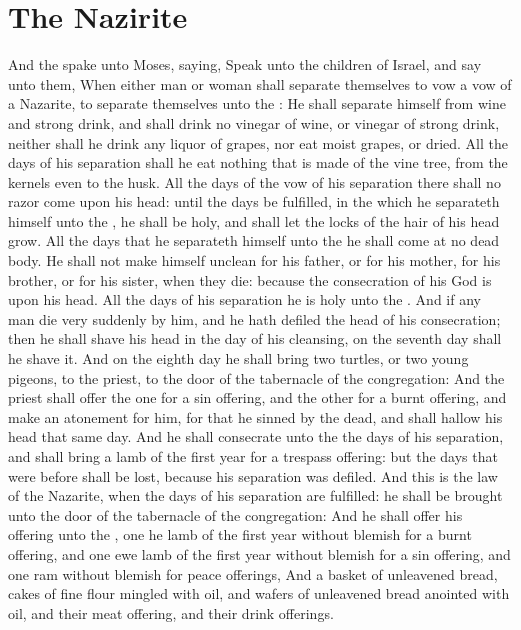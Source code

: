 \section*{The Nazirite}
\begin{biblechapter} %
\verse And the \LORD spake unto Moses, saying,
\verse Speak unto the children of Israel, and say unto them, When either man or woman shall separate themselves to vow a vow of a Nazarite, to separate themselves unto the \LORD:
\verse He shall separate himself from wine and strong drink, and shall drink no vinegar of wine, or vinegar of strong drink, neither shall he drink any liquor of grapes, nor eat moist grapes, or dried.
\verse All the days of his separation shall he eat nothing that is made of the vine tree, from the kernels even to the husk.
\verse All the days of the vow of his separation there shall no razor come upon his head: until the days be fulfilled, in the which he separateth himself unto the \LORD, he shall be holy, and shall let the locks of the hair of his head grow.
\verse All the days that he separateth himself unto the \LORD he shall come at no dead body.
\verse He shall not make himself unclean for his father, or for his mother, for his brother, or for his sister, when they die: because the consecration of his God is upon his head.
\verse All the days of his separation he is holy unto the \LORD.
\verse And if any man die very suddenly by him, and he hath defiled the head of his consecration; then he shall shave his head in the day of his cleansing, on the seventh day shall he shave it.
\verse And on the eighth day he shall bring two turtles, or two young pigeons, to the priest, to the door of the tabernacle of the congregation:
\verse And the priest shall offer the one for a sin offering, and the other for a burnt offering, and make an atonement for him, for that he sinned by the dead, and shall hallow his head that same day.
\verse And he shall consecrate unto the \LORD the days of his separation, and shall bring a lamb of the first year for a trespass offering: but the days that were before shall be lost, because his separation was defiled.
\verse And this is the law of the Nazarite, when the days of his separation are fulfilled: he shall be brought unto the door of the tabernacle of the congregation:
\verse And he shall offer his offering unto the \LORD, one he lamb of the first year without blemish for a burnt offering, and one ewe lamb of the first year without blemish for a sin offering, and one ram without blemish for peace offerings,
\verse And a basket of unleavened bread, cakes of fine flour mingled with oil, and wafers of unleavened bread anointed with oil, and their meat offering, and their drink offerings.

\end{biblechapter}
